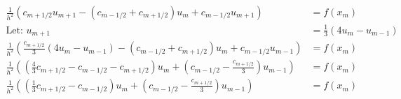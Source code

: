 \documentclass[]{article}
\begin{document}
        \begin{align*}\tag{1.a.4}\label{eqn:1.a.4}
            \frac{1}{h^2}\left(
                    c_{m + 1/2}u_{m + 1}
                    -
                    (c_{m - 1/2} + c_{m + 1/2})u_m + 
                    c_{m - 1/2}u_{m + 1}
                \right) &= f(x_m)
            \\
            \text{Let: }u_{m + 1} &= \frac{1}{3}(4u_m - u_{m - 1})
            \\
            \frac{1}{h^2}\left(
                \frac{c_{m + 1/2}}{3}(4u_m - u_{m - 1}) - 
                (c_{m - 1/2}+ c_{m + 1/2})u_m + 
                c_{m - 1/2}u_{m - 1}
            \right) &= f(x_m)
            \\
            \frac{1}{h^2}\left(
                \left(
                    \frac{4}{3}c_{m + 1/2} - c_{m - 1/2} - 
                    c_{m + 1/2}
                \right)u_m + 
                \left(
                    c_{m - 1/2} - \frac{c_{m + 1/2}}{3}
                \right)u_{m - 1}
            \right) &= f(x_m)
            \\
            \frac{1}{h^2}\left(
                \left(
                    \frac{1}{3}c_{m + 1/2} - c_{m - 1/2}
                \right)u_m + 
                \left(
                    c_{m - 1/2} - \frac{c_{m + 1/2}}{3}
                \right)u_{m - 1}
            \right) &= f(x_m)
        \end{align*}
\end{document}
